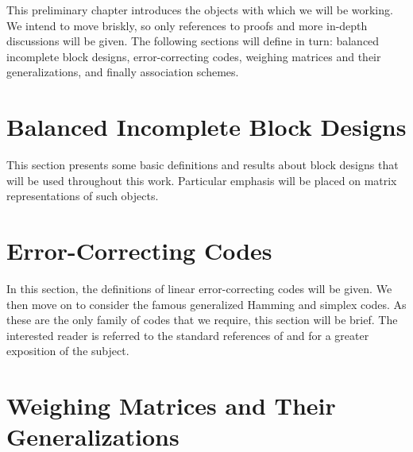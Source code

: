 \documentclass[../../main]{subfiles}
\begin{document}
This preliminary chapter introduces the objects with which we will be working.
We intend to move briskly, so only references to proofs and more in-depth
discussions will be given. The following sections will define in turn: balanced
incomplete block designs, error-correcting codes, weighing matrices and their
generalizations, and finally association schemes.

\fancyhf{}

\fancyhead[RO,LE]{\thepage}

\section{\centering Balanced Incomplete Block Designs}

This section presents some basic definitions and results about block designs
that will be used throughout this work. Particular emphasis will be placed on
matrix representations of such objects. 

\dinkus



\fancyhf{}

\fancyhead[RO,LE]{\thepage}

\section{\centering Error-Correcting Codes}

In this section, the definitions of linear error-correcting codes will be given.
We then move on to consider the famous generalized Hamming and simplex codes. As
these are the only family of codes that we require, this section will be brief.
The interested reader is referred to the standard references of \cite{pless-book}
and \cite{error-correcting-codes-v1} for a greater exposition of the subject. 

\dinkus



\fancyhf{}

\fancyhead[RO,LE]{\thepage}

\section{\centering Weighing Matrices and Their Generalizations}
\end{document}
